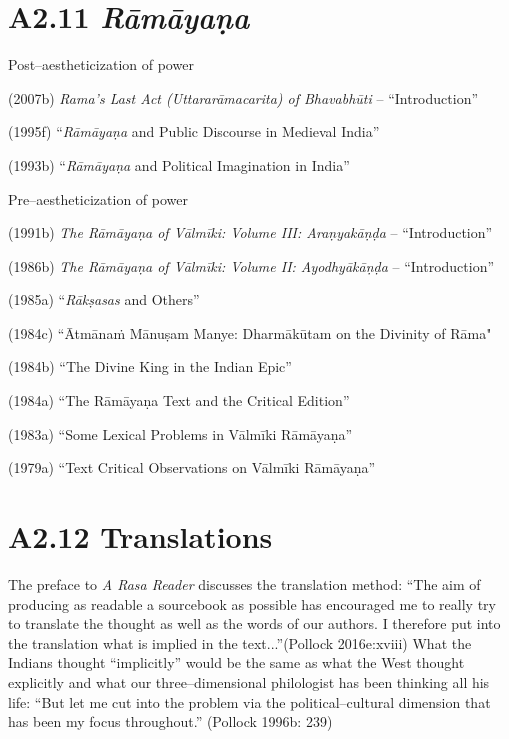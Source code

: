 \section*{A2.11 {\it {\bfseries Rāmāyaṇa}}}

Post–aestheticization of power

(2007b) \textit{Rama's Last Act (Uttararāmacarita) of Bhavabhūti} – “Introduction”

(1995f) “\textit{Rāmāyaṇa} and Public Discourse in Medieval India”

(1993b) “\textit{Rāmāyaṇa} and Political Imagination in India”

Pre–aestheticization of power

(1991b) \textit{The Rāmāyaṇa of Vālmīki: Volume III: Araṇyakāṇḍa} – “Introduction”

(1986b) \textit{The Rāmāyaṇa of Vālmīki: Volume II: Ayodhyākāṇḍa} – “Introduction”

(1985a) “\textit{Rākṣasas} and Others”

(1984c) “Ātmānaṁ Mānuṣam Manye: Dharmākūtam on the Divinity of Rāma"

(1984b) “The Divine King in the Indian Epic”

(1984a) “The Rāmāyaṇa Text and the Critical Edition”

(1983a) “Some Lexical Problems in Vālmīki Rāmāyaṇa”

(1979a) “Text Critical Observations on Vālmīki Rāmāyaṇa”

\vspace{-.3cm}

\section*{A2.12 Translations}

The preface to \textit{A Rasa Reader} discusses the translation method: “The aim of producing as readable a sourcebook as possible has encouraged me to really try to translate the thought as well as the words of our authors. I therefore put into the translation what is implied in the text...”(Pollock 2016e:xviii)  What the Indians thought “implicitly” would be the same as what the West thought explicitly and what our three–dimensional philologist has been thinking all his life: “But let me cut into the problem via the political–cultural dimension that has been my focus throughout.” (Pollock 1996b: 239)

